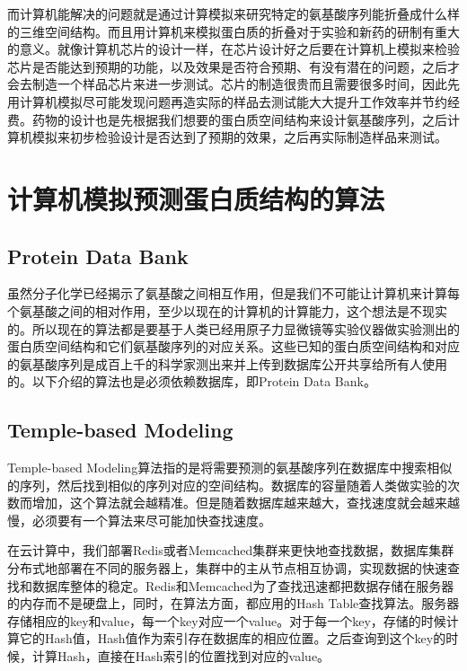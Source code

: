 \documentclass{article}
\begin{document}
而计算机能解决的问题就是通过计算模拟来研究特定的氨基酸序列能折叠成什么样的三维空间结构。而且用计算机来模拟蛋白质的折叠对于实验和新药的研制有重大的意义。就像计算机芯片的设计一样，在芯片设计好之后要在计算机上模拟来检验芯片是否能达到预期的功能，以及效果是否符合预期、有没有潜在的问题，之后才会去制造一个样品芯片来进一步测试。芯片的制造很贵而且需要很多时间，因此先用计算机模拟尽可能发现问题再造实际的样品去测试能大大提升工作效率并节约经费。药物的设计也是先根据我们想要的蛋白质空间结构来设计氨基酸序列，之后计算机模拟来初步检验设计是否达到了预期的效果，之后再实际制造样品来测试。

\section{计算机模拟预测蛋白质结构的算法}

\subsection{Protein Data Bank}

虽然分子化学已经揭示了氨基酸之间相互作用，但是我们不可能让计算机来计算每个氨基酸之间的相对作用，至少以现在的计算机的计算能力，这个想法是不现实的。所以现在的算法都是要基于人类已经用原子力显微镜等实验仪器做实验测出的蛋白质空间结构和它们氨基酸序列的对应关系。这些已知的蛋白质空间结构和对应的氨基酸序列是成百上千的科学家测出来并上传到数据库公开共享给所有人使用的。以下介绍的算法也是必须依赖数据库，即Protein Data Bank。

\subsection{Temple-based Modeling}

Temple-based Modeling算法指的是将需要预测的氨基酸序列在数据库中搜索相似的序列，然后找到相似的序列对应的空间结构。数据库的容量随着人类做实验的次数而增加，这个算法就会越精准。但是随着数据库越来越大，查找速度就会越来越慢，必须要有一个算法来尽可能加快查找速度。

在云计算中，我们部署Redis或者Memcached集群来更快地查找数据，数据库集群分布式地部署在不同的服务器上，集群中的主从节点相互协调，实现数据的快速查找和数据库整体的稳定。Redis和Memcached为了查找迅速都把数据存储在服务器的内存而不是硬盘上，同时，在算法方面，都应用的Hash Table查找算法。服务器存储相应的key和value，每一个key对应一个value。对于每一个key，存储的时候计算它的Hash值，Hash值作为索引存在数据库的相应位置。之后查询到这个key的时候，计算Hash，直接在Hash索引的位置找到对应的value。
\end{document}
